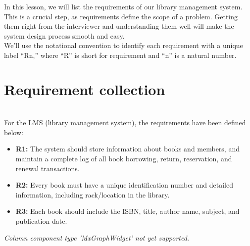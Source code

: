

In this lesson, we will list the requirements of our library management system. This is a crucial step, as requirements define the scope of a problem. Getting them right from the interviewer and understanding them well will make the system design process smooth and easy.
\\
We'll use the notational convention to identify each requirement with a unique label ``Rn,'' where ``R'' is short for requirement and ``n'' is a natural number.

\section{Requirement collection}\label{requirement-collection}
\\
For the LMS (library management system), the requirements have been defined below:

\noindent
\begin{minipage}[t]{0.48\textwidth}\vspace{0pt}
\begin{itemize}
\item
\textbf{R1:} The system should store information about books and members, and maintain a complete log of all book borrowing, return, reservation, and renewal transactions.
\item
\textbf{R2:} Every book must have a unique identification number and detailed information, including rack/location in the library.
\item
\textbf{R3:} Each book should include the ISBN, title, author name, subject, and publication date.
\end{itemize}
\end{minipage}
\hfill
\begin{minipage}[t]{0.48\textwidth}\vspace{0pt}
\textit{Column component type 'MxGraphWidget' not yet supported.}
\end{minipage}

